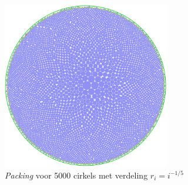 \documentclass[12pt,a4paper,oneside]{book}
\begin{document}
\begin{figure}
  \centering
  \includegraphics[width=0.65\textwidth]{packing-neg1div5-5000.png}
  \caption{\textit{Packing} voor 5000 cirkels met verdeling $r_i=i^{-1/5}$}
\end{figure}

\newpage
\end{document}
